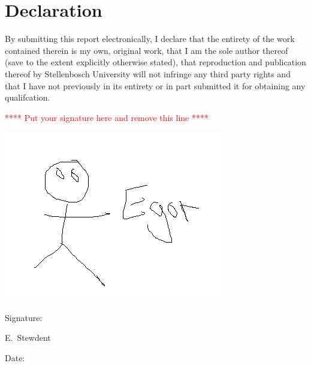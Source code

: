 \chapter{Declaration}

By submitting this report electronically, I declare that the entirety of the work contained
therein is my own, original work, that I am the sole author thereof (save to the extent
explicitly otherwise stated), that reproduction and publication thereof by Stellenbosch
University will not infringe any third party rights and that I have not previously in its
entirety or in part submitted it for obtaining any qualifcation.

\vspace{3cm}

\textcolor{red}{ **** Put your signature here and remove this line ****}

\includegraphics[scale=0.3]{./Figures/Signature.png}\\
\noindent%
\parbox{.5\textwidth}{%
  Signature:\quad\dotfill\par
  \hfill E.\ Stewdent\hspace{1.2cm}\null}


\vspace{1.5cm}
\noindent%
\parbox{.5\textwidth}{%
  Date:\quad\dotfill\par}
